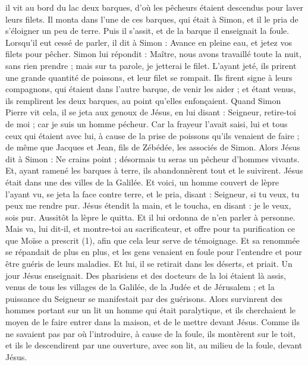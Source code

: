 \begin{multicols}{2}
il vit au bord du lac deux barques, d’où les pêcheurs étaient descendus pour laver leurs filets.
Il monta dans l'une de ces barques, qui était à Simon, et il le pria de s’éloigner un peu de terre. Puis il s’assit, et de la barque il enseignait la foule.
Lorsqu’il eut cessé de parler, il dit à Simon : Avance en pleine eau, et jetez vos filets pour pêcher.
Simon lui répondit : Maître, nous avons travaillé toute la nuit, sans rien prendre ; mais sur ta parole, je jetterai le filet.
L’ayant jeté, ils prirent une grande quantité de poissons, et leur filet se rompait.
Ils firent signe à leurs compagnons, qui étaient dans l'autre barque, de venir les aider ; et étant venus, ils remplirent les deux barques, au point qu'elles enfonçaient.
Quand Simon Pierre vit cela, il se jeta aux genoux de Jésus, en lui disant : Seigneur, retire-toi de moi ; car je suis un homme pécheur.
Car la frayeur l'avait saisi, lui et tous ceux qui étaient avec lui, à cause de la prise de poissons qu'ils venaient de faire ; de même que Jacques et Jean, fils de Zébédée, les associés de Simon.
Alors Jésus dit à Simon : Ne crains point ; désormais tu seras un pêcheur d'hommes vivants.
Et, ayant ramené les barques à terre, ils abandonnèrent tout et le suivirent.
Jésus était dans une des villes de la Galilée. Et voici, un homme couvert de lèpre l’ayant vu, se jeta la face contre terre, et le pria, disant : Seigneur, si tu veux, tu peux me rendre pur.
Jésus étendit la main, et le toucha, en disant : je le veux, sois pur. Aussitôt la lèpre le quitta.
Et il lui ordonna de n’en parler à personne. Mais va, lui dit-il, et montre-toi au sacrificateur, et offre pour ta purification ce que Moïse a prescrit (1), afin que cela leur serve de témoignage.
Et sa renommée se répandait de plus en plus, et les gens venaient en foule pour l’entendre et pour être guéris de leurs maladies.
Et lui, il se retirait dans les déserts, et priait.
Un jour Jésus enseignait. Des pharisiens et des docteurs de la loi étaient là assis, venus de tous les villages de la Galilée, de la Judée et de Jérusalem ; et la puissance du Seigneur se manifestait par des guérisons.
Alors survinrent des hommes portant sur un lit un homme qui était paralytique, et ils cherchaient le moyen de le faire entrer dans la maison, et de le mettre devant Jésus.
Comme ils ne savaient pas par où l’introduire, à cause de la foule, ils montèrent sur le toit, et ils le descendirent par une ouverture, avec son lit, au milieu de la foule, devant Jésus.

\end{multicols}
